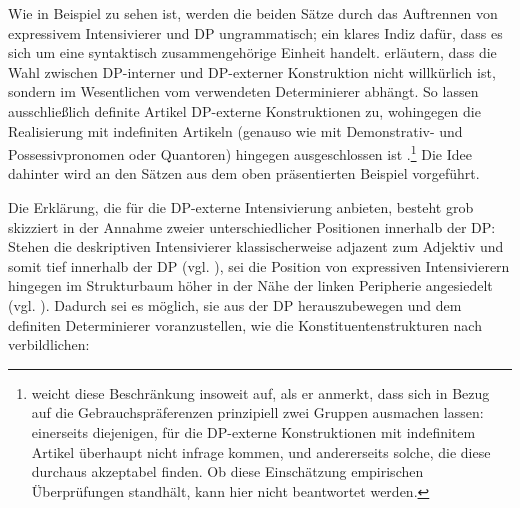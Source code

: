 \ea   \label{dpex2}
 \z
 \z
Wie in Beispiel  zu sehen ist, werden die beiden Sätze durch das Auftrennen von expressivem Intensivierer und DP ungrammatisch; ein klares Indiz dafür, dass es sich um eine syntaktisch zusammengehörige Einheit handelt. \citet[155]{Gutzmann.2012} erläutern, dass die Wahl zwischen DP-interner und DP-externer Konstruktion nicht willkürlich ist, sondern im Wesentlichen vom verwendeten Determinierer abhängt. So lassen ausschließlich definite Artikel DP-externe Konstruktionen zu, wohingegen die Realisierung mit indefiniten Artikeln (genauso wie mit Demonstrativ- und Possessivpronomen oder Quantoren) hingegen ausgeschlossen ist {\citep[vgl.][155]{Gutzmann.2012}}.\footnote{\citet[146]{Gutzmann.2019a} weicht diese Beschränkung insoweit auf, als er anmerkt, dass sich in Bezug auf die Gebrauchspräferenzen prinzipiell zwei Gruppen ausmachen lassen: einerseits diejenigen, für die DP-externe Konstruktionen mit indefinitem Artikel überhaupt nicht infrage kommen, und andererseits solche, die diese durchaus akzeptabel finden. Ob diese Einschätzung empirischen Überprüfungen standhält, kann hier nicht beantwortet {werden.}} Die Idee dahinter wird an den Sätzen aus dem oben präsentierten Beispiel  vorgeführt.

\ea
{}
 \z
 \z
Die Erklärung, die \citet[159f.]{Gutzmann.2012} für die DP-externe Intensivierung anbieten, besteht grob skizziert in der Annahme zweier unterschiedlicher Positionen innerhalb der DP: Stehen die deskriptiven Intensivierer klassischerweise adjazent zum Adjektiv und somit tief innerhalb der DP (vgl. ), sei die Position von expressiven Intensivierern hingegen im Strukturbaum höher in der Nähe der linken Peripherie angesiedelt {(vgl. )}. Dadurch sei es möglich, sie aus der DP herauszubewegen und dem definiten Determinierer voranzustellen, wie die Konstituentenstrukturen nach \citet[160]{Gutzmann.2012} verbildlichen:

\ea
{}
 \z
 \z


